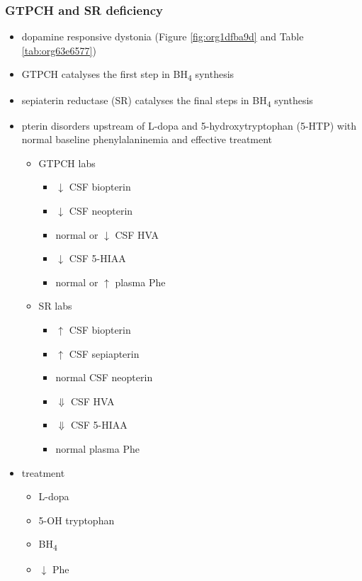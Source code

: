 \documentclass[12pt]{scrartcl}
\begin{document}
\subsubsection{GTPCH and SR deficiency}
\label{sec:org59566d4}
\begin{itemize}
\item dopamine responsive dystonia (Figure \ref{fig:org1dfba9d} and Table \ref{tab:org63e6577})
\item GTPCH catalyses the first step in BH\textsubscript{4} synthesis
\item sepiaterin reductase (SR) catalyses the final steps in BH\textsubscript{4} synthesis
\item pterin disorders upstream of L-dopa and 5-hydroxytryptophan
(5-HTP) with normal baseline phenylalaninemia and effective
treatment
\begin{itemize}
\item GTPCH labs
\begin{itemize}
\item \(\downarrow\) CSF biopterin
\item \(\downarrow\) CSF neopterin
\item normal or \(\downarrow\) CSF HVA
\item \(\downarrow\) CSF 5-HIAA
\item normal or \(\uparrow\) plasma Phe
\end{itemize}
\item SR labs
\begin{itemize}
\item \(\uparrow\) CSF biopterin
\item \(\uparrow\) CSF sepiapterin
\item normal CSF neopterin
\item \(\Downarrow\) CSF HVA
\item \(\Downarrow\) CSF 5-HIAA
\item normal plasma Phe
\end{itemize}
\end{itemize}
\item treatment
\begin{itemize}
\item L-dopa
\item 5-OH tryptophan
\item BH\textsubscript{4}
\item \(\downarrow\) Phe
\end{itemize}
\end{itemize}
\end{document}
